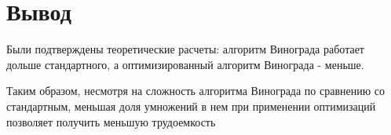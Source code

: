 \clearpage
{}



\clearpage
\section*{Вывод}

Были подтверждены теоретические расчеты: алгоритм Винограда работает дольше стандартного, а оптимизированный алгоритм Винограда - меньше.
 
Таким образом, несмотря на сложность алгоритма Винограда по сравнению со стандартным, меньшая доля умножений в нем при применении оптимизаций позволяет получить меньшую трудоемкость

